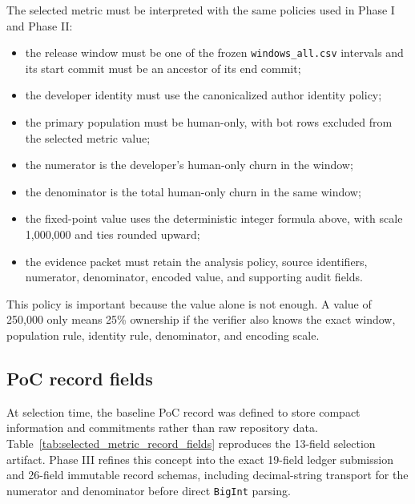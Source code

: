 The selected metric must be interpreted with the same policies used in Phase I and Phase II:
\begin{itemize}[leftmargin=*]
  \item the release window must be one of the frozen \texttt{windows\_all.csv} intervals and its start commit must be an ancestor of its end commit;
  \item the developer identity must use the canonicalized author identity policy;
  \item the primary population must be human-only, with bot rows excluded from the selected metric value;
  \item the numerator is the developer's human-only churn in the window;
  \item the denominator is the total human-only churn in the same window;
  \item the fixed-point value uses the deterministic integer formula above, with scale 1,000,000 and ties rounded upward;
  \item the evidence packet must retain the analysis policy, source identifiers, numerator, denominator, encoded value, and supporting audit fields.
\end{itemize}

This policy is important because the value alone is not enough. A value of 250,000 only means 25\% ownership if
the verifier also knows the exact window, population rule, identity rule, denominator, and encoding scale.

\subsection{PoC record fields}
\label{sec:selected_metric_record_fields}

At selection time, the baseline PoC record was defined to store compact information and commitments rather than raw repository
data. Table~\ref{tab:selected_metric_record_fields} reproduces the 13-field selection artifact. Phase III refines this concept
into the exact 19-field ledger submission and 26-field immutable record schemas, including decimal-string transport for the
numerator and denominator before direct \texttt{BigInt} parsing.

